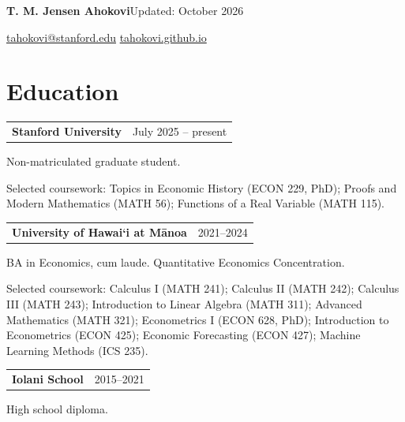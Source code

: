 \documentclass[10pt,letterpaper]{article}
\begin{document}
{\LARGE\bfseries T. M. Jensen Ahokovi}\hfill {\small Updated: October 2026}\par
\href{mailto:tahokovi@stanford.edu}{tahokovi@stanford.edu} \enspace\textbar\enspace \href{https://tahokovi.github.io}{tahokovi.github.io}\par

\section*{Education}
\begin{tabularx}{\linewidth}{@{}X r@{}}\textbf{Stanford University} & {\small July 2025 -- present}\\\end{tabularx}
Non-matriculated graduate student. \par
{\small Selected coursework: Topics in Economic History (ECON 229, PhD); Proofs and Modern Mathematics (MATH 56); Functions of a Real Variable (MATH 115).}\par
\vspace{4pt}
\begin{tabularx}{\linewidth}{@{}X r@{}}\textbf{University of Hawai`i at M\={a}noa} & {\small 2021--2024}\\\end{tabularx}
BA in Economics, cum laude. Quantitative Economics Concentration.\par
{\small Selected coursework: Calculus I (MATH 241); Calculus II (MATH 242); Calculus III (MATH 243); Introduction to Linear Algebra (MATH 311); Advanced Mathematics (MATH 321); Econometrics I (ECON 628, PhD); Introduction to Econometrics (ECON 425); Economic Forecasting (ECON 427); Machine Learning Methods (ICS 235).}\par
\vspace{4pt}
\begin{tabularx}{\linewidth}{@{}X r@{}}\textbf{Iolani School} & {\small 2015--2021}\\\end{tabularx}
High school diploma. \par
\vspace{4pt}
\end{document}
